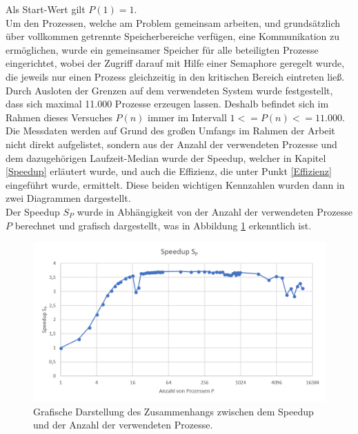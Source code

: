 \begin{description}
						Als Start-Wert gilt $P(1) = 1$.\\
						Um den Prozessen, welche am Problem gemeinsam arbeiten, und grundsätzlich über vollkommen getrennte Speicherbereiche verfügen, eine Kommunikation zu ermöglichen, wurde ein gemeinsamer Speicher für alle beteiligten Prozesse eingerichtet, wobei der Zugriff darauf mit Hilfe einer Semaphore geregelt wurde, die jeweils nur einen Prozess gleichzeitig in den kritischen Bereich eintreten ließ.\\
						Durch Ausloten der Grenzen auf dem verwendeten System wurde festgestellt, dass sich maximal 11.000 Prozesse erzeugen lassen. Deshalb befindet sich im Rahmen dieses Versuches $P(n)$ immer im Intervall $1 <= P(n) <= 11.000$.
						Die Messdaten werden auf Grund des großen Umfangs im Rahmen der Arbeit nicht direkt aufgelistet, sondern aus der Anzahl der verwendeten Prozesse und dem dazugehörigen Laufzeit-Median wurde der Speedup, welcher in Kapitel \ref{Speedup} erläutert wurde, und auch die Effizienz, die unter Punkt \ref{Effizienz} eingeführt wurde, ermittelt. Diese beiden wichtigen Kennzahlen wurden dann in zwei Diagrammen dargestellt.\\
						Der Speedup $S_P$ wurde in Abhängigkeit von der Anzahl der verwendeten Prozesse $P$ berechnet und grafisch dargestellt, was in Abbildung \ref{fig:Speedup_Prozesse} erkenntlich ist.
						
						\begin{figure}
							\centering	
							\includegraphics[width=12cm]{Abbildungen/Speedup_Prozesse.png}
							\caption{Grafische Darstellung des Zusammenhangs zwischen dem Speedup und der Anzahl der verwendeten Prozesse.}
							\label{fig:Speedup_Prozesse}
						\end{figure}
						

\end{description}
